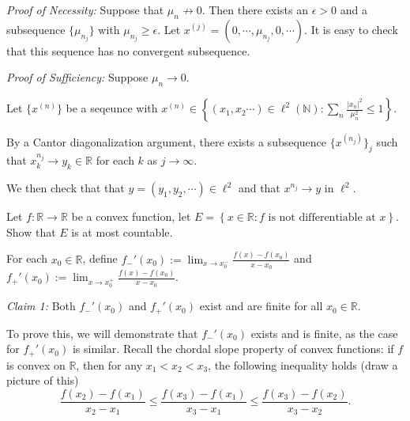 \documentclass[answers]{exam}
\theoremstyle{problemstyle}
\newcommand{\vt}{\vskip 5mm} %
\newcommand{\1}[1]{\textbf{1}_{\left[#1\right]}} %
\def\R{\mathbb{R}} %
\begin{document}
\begin{questions}
\begin{parts}
\begin{solution}
\vt
\textit{Proof of Necessity:} Suppose that $\mu_n\not\to 0$. Then there exists an $\epsilon>0$ and a subsequence $\{\mu_{n_j}\}$ with $\mu_{n_j}\geq \epsilon$.
Let $x^{(j)} = (0,\cdots,\mu_{n_j},0,\cdots)$. It is easy to check that this sequence has no convergent subsequence.

\vt
\textit{Proof of Sufficiency:} Suppose $\mu_n\to 0$. 


Let $\{x^{(n)}\}$ be a seqeunce with $x^{(n)}\in \left\{ (x_{1},x_{2}\cdots) \in \ell^{2}(\mathbb{N}): \sum_{n}\frac{|x_{n}|^{2}}{\mu_{n}^{2}}\leq 1\right\}$.

By a Cantor diagonalization argument, there exists a subsequence $\{x^{(n_j)}\}_j$ such that $x^{n_j}_k\to y_k\in \R$ for each $k$ as $j\to\infty$. 

We then check that that $y = (y_1,y_2,\cdots) \in \ell^2$ and that $x^{n_j}\to y$ in $\ell^2$.

\end{solution}
\end{parts}


\question Let $f:\R\to\R$ be a convex function, let $E=\left\{ x\in \R : f \text{ is not differentiable at }x\right\}$. Show that $E$ is at most countable.


\begin{solution}
For each $x_{0}\in \R$, define $f_{-}'(x_{0}) := \lim_{x\to x_{0}^{-}} \frac{f(x)-f(x_{0})}{x-x_{0}}$ and $f_{+}'(x_{0}) := \lim_{x\to x_{0}^{+}} \frac{f(x)-f(x_{0})}{x-x_{0}}$.

\vt
\textit{Claim 1:} Both $f_{-}'(x_{0})$ and $f_{+}'(x_{0})$ exist and are finite for all $x_{0}\in \R$. 


To prove this, we will demonstrate that $f_{-}'(x_{0})$ exists and is finite, as the case for $f_{+}'(x_{0})$ is similar. Recall the chordal slope property of convex functions: if $f$ is convex on $\R$, then for any $x_{1}<x_{2}<x_{3}$, the following inequality holds (draw a picture of this)
\begin{equation}\label{eq:chord-inequality}
  \frac{f(x_{2})-f(x_{1})}{x_{2}-x_{1}}\leq \frac{f(x_{3})-f(x_{1})}{x_{3}-x_{1}}\leq \frac{f(x_{3})-f(x_{2})}{x_{3}-x_{2}}.
\end{equation}


\end{solution}
\end{questions}
\end{document}
